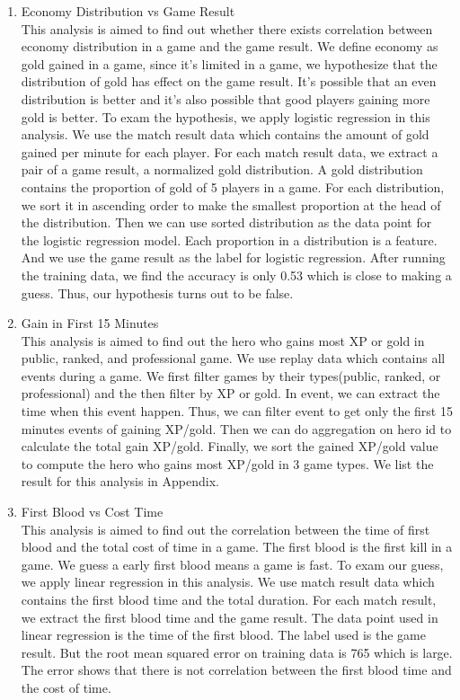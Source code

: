 \documentclass{article}
\begin{document}
\begin{enumerate}
    \item Economy Distribution vs Game Result \\
    This analysis is aimed to find out whether there exists correlation between economy distribution in a game and the game result. We define economy as gold gained in a game, since it's limited in a game, we hypothesize that the distribution of gold has effect on the game result. It's possible that an even distribution is better and it's also possible that good players gaining more gold is better. To exam the hypothesis, we apply logistic regression in this analysis. We use the match result data which contains the amount of gold gained per minute for each player. For each match result data, we extract a pair of a game result, a normalized gold distribution. A gold distribution contains the proportion of gold of 5 players in a game. For each distribution, we sort it in ascending order to make the smallest proportion at the head of the distribution. Then we can use sorted distribution as the data point for the logistic regression model. Each proportion in a distribution is a feature. And we use the game result as the label for logistic regression. After running the training data, we find the accuracy is only 0.53 which is close to making a guess. Thus, our hypothesis turns out to be false.
    \item Gain in First 15 Minutes \\
    This analysis is aimed to find out the hero who gains most XP or gold in public, ranked, and professional game. We use replay data which contains all events during a game. We first filter games by their types(public, ranked, or professional) and the then filter by XP or gold. In event, we can extract the time when this event happen. Thus, we can filter event to get only the first 15 minutes events of gaining XP/gold. Then we can do aggregation on hero id to calculate the total gain XP/gold. Finally, we sort the gained XP/gold value to compute the hero who gains most XP/gold in 3 game types. We list the result for this analysis in Appendix.
    \item First Blood vs Cost Time\\
    This analysis is aimed to find out the correlation between the time of first blood and the total cost of time in a game. The first blood is the first kill in a game. We guess a early first blood means a game is fast. To exam our guess, we apply linear regression in this analysis. We use match result data which contains the first blood time and the total duration. For each match result, we extract the first blood time and the game result. The data point used in linear regression is the time of the first blood. The label used is the game result. But the root mean squared error on training data is 765 which is large. The error shows that there is not correlation between the first blood time and the cost of time.

\end{enumerate}
\end{document}
